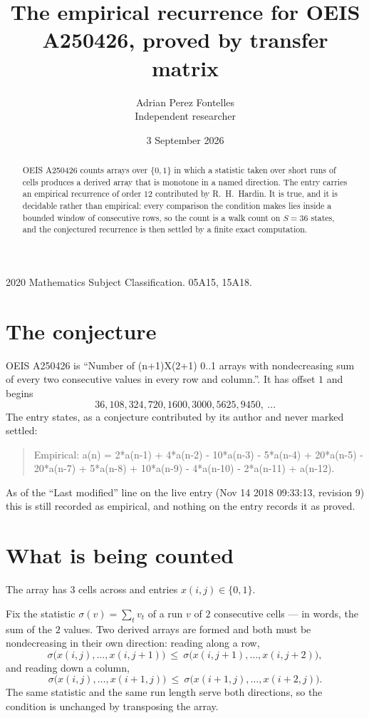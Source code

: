 \documentclass[11pt,a4paper]{article}
\title{The empirical recurrence for OEIS A250426, proved by transfer matrix}
\author{Adrian Perez Fontelles\\ \small Independent researcher}
\date{3 September 2026}
\theoremstyle{plain}
\theoremstyle{definition}
\begin{document}
\maketitle

\begin{abstract}
OEIS A250426 counts arrays over $\{0,1\}$ in which a statistic taken over short runs
of cells produces a derived array that is monotone in a named direction. The entry carries an
empirical recurrence of order $12$ contributed by R.~H.~Hardin. It is true, and it is
decidable rather than empirical: every comparison the condition makes lies inside a bounded
window of consecutive rows, so the count is a walk count on $S=36$ states, and the
conjectured recurrence is then settled by a finite exact computation.
\end{abstract}

\noindent\small 2020 Mathematics Subject Classification. 05A15, 15A18.\normalsize

\section{The conjecture}

OEIS A250426 is ``Number of (n+1)X(2+1) 0..1 arrays with nondecreasing sum of every two consecutive values in every row and column.''. It has offset $1$ and begins
\[
36, 108, 324, 720, 1600, 3000, 5625, 9450,\ \dots
\]
The entry states, as a conjecture contributed by its author and never marked settled:
\begin{quote}
Empirical: a(n) = 2*a(n-1) + 4*a(n-2) - 10*a(n-3) - 5*a(n-4) + 20*a(n-5) - 20*a(n-7) + 5*a(n-8) + 10*a(n-9) - 4*a(n-10) - 2*a(n-11) + a(n-12).
\end{quote}
As of the ``Last modified'' line on the live entry (Nov 14 2018 09:33:13, revision 9) this is still
recorded as empirical, and nothing on the entry records it as proved.

\section{What is being counted}

The array has $3$ cells across and entries $x(i,j)\in\{0,1\}$.

Fix the statistic $\sigma(v)=\sum_{t} v_t$ of a run $v$ of $2$ consecutive cells --- in words,
the sum of the $2$ values. Two derived arrays are formed and both must be
nondecreasing in their own direction: reading along a row,
\[
\sigma\bigl(x(i,j),\dots,x(i,j{+}1)\bigr)\ \le\
\sigma\bigl(x(i,j{+}1),\dots,x(i,j{+}2)\bigr),
\]
and reading down a column,
\[
\sigma\bigl(x(i,j),\dots,x(i{+}1,j)\bigr)\ \le\
\sigma\bigl(x(i{+}1,j),\dots,x(i{+}2,j)\bigr).
\]
The same statistic and the same run length serve both directions, so the condition is
unchanged by transposing the array.
\end{document}
